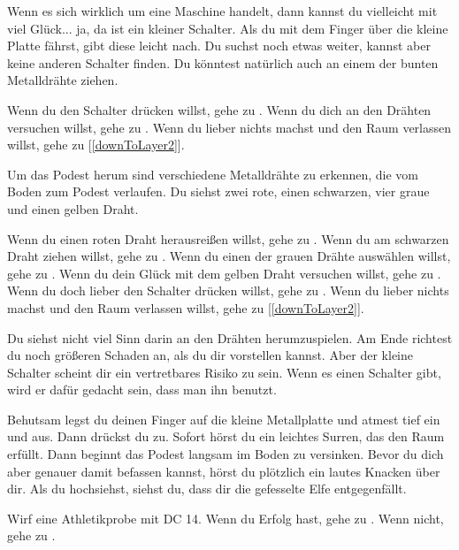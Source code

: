
Wenn es sich wirklich um eine Maschine handelt, dann kannst du vielleicht mit viel Glück... ja, da ist ein kleiner Schalter. Als du mit dem Finger über die kleine Platte fährst, gibt diese leicht nach. Du suchst noch etwas weiter, kannst aber keine anderen Schalter finden. Du könntest natürlich auch an einem der bunten Metalldrähte ziehen.

Wenn du den Schalter drücken willst, gehe zu .
Wenn du dich an den Drähten versuchen willst, gehe zu .
Wenn du lieber nichts machst und den Raum verlassen willst, gehe zu [\ref{downToLayer2}].


Um das Podest herum sind verschiedene Metalldrähte zu erkennen, die vom Boden zum Podest verlaufen. Du siehst zwei rote, einen schwarzen, vier graue und einen gelben Draht.

Wenn du einen roten Draht herausreißen willst, gehe zu .
Wenn du am schwarzen Draht ziehen willst, gehe zu .
Wenn du einen der grauen Drähte auswählen willst, gehe zu .
Wenn du dein Glück mit dem gelben Draht versuchen willst, gehe zu .
Wenn du doch lieber den Schalter drücken willst, gehe zu .
Wenn du lieber nichts machst und den Raum verlassen willst, gehe zu [\ref{downToLayer2}].


Du siehst nicht viel Sinn darin an den Drähten herumzuspielen. Am Ende richtest du noch größeren Schaden an, als du dir vorstellen kannst. Aber der kleine Schalter scheint dir ein vertretbares Risiko zu sein. Wenn es einen Schalter gibt, wird er dafür gedacht sein, dass man ihn benutzt.

Behutsam legst du deinen Finger auf die kleine Metallplatte und atmest tief ein und aus. Dann drückst du zu. Sofort hörst du ein leichtes Surren, das den Raum erfüllt. Dann beginnt das Podest langsam im Boden zu versinken. Bevor du dich aber genauer damit befassen kannst, hörst du plötzlich ein lautes Knacken über dir. Als du hochsiehst, siehst du, dass dir die gefesselte Elfe entgegenfällt.

Wirf eine Athletikprobe mit DC 14. Wenn du Erfolg hast, gehe zu . Wenn nicht, gehe zu .


